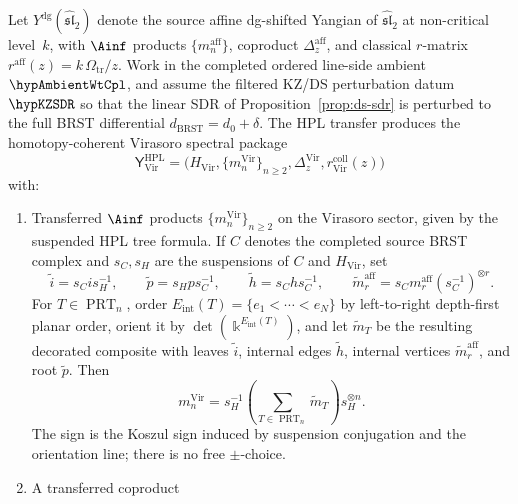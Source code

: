\begin{theorem}\label{thm:ds-hpl-transfer}
Let $Y^{\mathrm{dg}}(\widehat{\mathfrak{sl}}_2)$ denote the
source affine dg-shifted Yangian of $\widehat{\mathfrak{sl}}_2$
at non-critical level~$k$,
with $\Ainf$ products $\{m_n^{\mathrm{aff}}\}$,
coproduct $\Delta_z^{\mathrm{aff}}$, and classical $r$-matrix
$r^{\mathrm{aff}}(z) = k\,\Omega_{\mathrm{tr}}/z$.  Work in the
completed ordered line-side ambient \(\hypAmbientWtCpl\), and assume
the filtered KZ/DS perturbation datum \(\hypKZSDR\) so that the
linear SDR of Proposition~\textup{\ref{prop:ds-sdr}} is perturbed to
the full BRST differential \(d_{\mathrm{BRST}}=d_0+\delta\).
The HPL transfer produces the homotopy-coherent Virasoro spectral
package
\[
\mathsf Y_{\mathrm{Vir}}^{\mathrm{HPL}}
=
\bigl(
H_{\mathrm{Vir}},\{m_n^{\mathrm{Vir}}\}_{n\ge2},
\Delta_z^{\mathrm{Vir}},
r_{\mathrm{Vir}}^{\mathrm{coll}}(z)
\bigr)
\]
with:
\begin{enumerate}[label=\textup{(\roman*)}]
\item Transferred $\Ainf$ products
 $\{m_n^{\mathrm{Vir}}\}_{n \ge 2}$ on the Virasoro sector,
 given by the suspended HPL tree formula.  If \(C\) denotes the
 completed source BRST complex and \(s_C,s_H\) are the suspensions of
 \(C\) and \(H_{\mathrm{Vir}}\), set
\[
\widetilde i=s_C i s_H^{-1},\qquad
\widetilde p=s_H p s_C^{-1},\qquad
\widetilde h=s_C h s_C^{-1},\qquad
\widetilde m_r^{\mathrm{aff}}
=s_C m_r^{\mathrm{aff}}(s_C^{-1})^{\otimes r}.
\]
For \(T\in\operatorname{PRT}_n\), order
\(E_{\mathrm{int}}(T)=\{e_1<\cdots<e_N\}\) by left-to-right
depth-first planar order, orient it by
\(\det(\Bbbk^{E_{\mathrm{int}}(T)})\), and let
\(\widetilde m_T\) be the resulting decorated composite with leaves
\(\widetilde i\), internal edges \(\widetilde h\), internal vertices
\(\widetilde m_r^{\mathrm{aff}}\), and root \(\widetilde p\).  Then
\begin{equation}\label{eq:gravity-suspended-hpl-transfer}
m_n^{\mathrm{Vir}}
=
s_H^{-1}
\left(
\sum_{T\in\operatorname{PRT}_n}\widetilde m_T
\right)
s_H^{\otimes n}.
\end{equation}
The sign is the Koszul sign induced by suspension conjugation and the
orientation line; there is no free \(\pm\)-choice.
\item A transferred coproduct

\end{enumerate}
\end{theorem}
